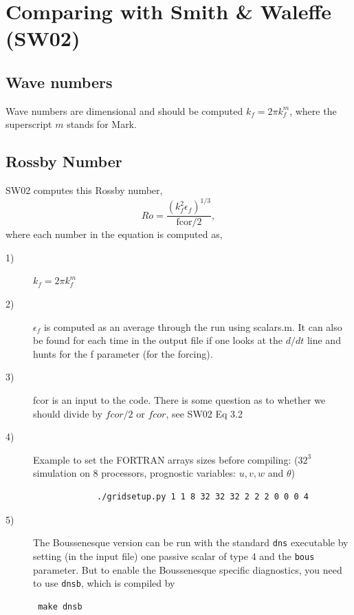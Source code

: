 \documentclass[12pt]{article}
\begin{document}
\section{Comparing with Smith \& Waleffe (SW02)}

\subsection*{Wave numbers}
Wave numbers are dimensional and should be computed $k_f = 2 \pi
k_f^m$, where the superscript $m$ stands for Mark. 

\subsection*{Rossby Number}
SW02 computes this Rossby number,
\begin{equation}
  Ro = \frac{(k_f^2 \epsilon_f)^{1/3}}{\text{fcor}/2}, 
\end{equation}
where each number in the equation is computed as,
\begin{description}
   \item[1)] $k_f = 2 \pi k_f^m$
   \item[2)] $\epsilon_f$ is computed as an average through the run using
     scalars.m. It can also be found for each time in the output file
     if one looks at the $d/dt$ line and hunts for the f parameter (for
     the forcing).
  \item[3)] fcor is an input to the code. There is some question as to
    whether we should divide by $fcor/2$ or $fcor$, see SW02 Eq 3.2
  \item[4)] Example to set the FORTRAN arrays sizes before compiling:  
           ($32^3$ simulation on 8 processors, prognostic variables: 
            $u,v,w$ and $\theta$) \\
            \begin{verbatim}
             ./gridsetup.py 1 1 8 32 32 32 2 2 2 0 0 0 4
            \end{verbatim}
\item[5)] The Boussenesque version can be run with the standard
\texttt{dns} executable by setting (in the
input file) one passive scalar of type 4 and the 
\texttt{bous} parameter.  But to
enable the Boussenesque specific diagnostics, you need to use
\texttt{dnsb}, which is compiled by \begin{verbatim} make dnsb
\end{verbatim}

\end{description}
\end{document}
